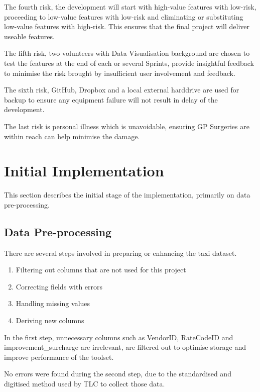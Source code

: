 \documentclass[11pt,a4paper]{article}
\begin{document}
The fourth risk,  the development will start with high-value features with low-risk, proceeding to low-value features with low-risk and eliminating or substituting low-value features with high-risk. This ensures that the final project will deliver useable features.

The fifth risk, two volunteers with Data Visualisation background are chosen to test the features at the end of each or several Sprints, provide insightful feedback to minimise the risk brought by insufficient user involvement and feedback.

The sixth risk, GitHub, Dropbox and a local external harddrive are used for backup to ensure any equipment failure will not result in delay of the development.


The last risk is personal illness which is unavoidable, ensuring GP Surgeries are within reach can help minimise the damage.

\section{Initial Implementation}
\label{sec5}
This section describes the initial stage of the implementation, primarily on data pre-processing.

\subsection{Data Pre-processing}
There are several steps involved in preparing or enhancing the taxi dataset.
\begin{enumerate}
	\item Filtering out columns that are not used for this project
	\item Correcting fields with errors
	\item Handling missing values
	\item Deriving new columns
\end{enumerate}

In the first step, unnecessary columns such as VendorID, RateCodeID and improvement\_surcharge are irrelevant, are filtered out to optimise storage and improve performance of the toolset.

No errors were found during the second step, due to the standardised and digitised method used by TLC to collect those data.
\end{document}
